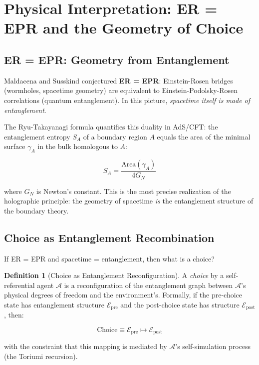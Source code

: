 \documentclass[12pt,a4paper]{article}
\theoremstyle{definition}
\newtheorem{definition}[theorem]{Definition}
\theoremstyle{remark}
\newcommand{\cA}{\mathcal{A}}
\begin{document}
\section{Physical Interpretation: ER = EPR and the Geometry of Choice}

\subsection{ER = EPR: Geometry from Entanglement}

Maldacena and Susskind \cite{maldacena2013} conjectured \textbf{ER = EPR}:
Einstein-Rosen bridges (wormholes, spacetime geometry) are equivalent to
Einstein-Podolsky-Rosen correlations (quantum entanglement). In this picture,
\textit{spacetime itself is made of entanglement}.

The Ryu-Takayanagi formula \cite{ryu2006a, ryu2006b} quantifies this duality
in AdS/CFT: the entanglement entropy $S_A$ of a boundary region $A$ equals the
area of the minimal surface $\gamma_A$ in the bulk homologous to $A$:

\begin{equation}
S_A = \frac{\text{Area}(\gamma_A)}{4G_N}
\end{equation}

where $G_N$ is Newton's constant. This is the most precise realization of the
holographic principle: the geometry of spacetime \emph{is} the entanglement
structure of the boundary theory.

\subsection{Choice as Entanglement Recombination}

If ER = EPR and spacetime = entanglement, then what is a choice?

\begin{definition}[Choice as Entanglement Reconfiguration]
A \emph{choice} by a self-referential agent $\cA$ is a reconfiguration of the
entanglement graph between $\cA$'s physical degrees of freedom and the
environment's. Formally, if the pre-choice state has entanglement structure
$\mathcal{E}_{\text{pre}}$ and the post-choice state has structure
$\mathcal{E}_{\text{post}}$, then:

\begin{equation}
\text{Choice} \equiv \mathcal{E}_{\text{pre}} \mapsto \mathcal{E}_{\text{post}}
\end{equation}

with the constraint that this mapping is mediated by $\cA$'s self-simulation
process (the Toriumi recursion).
\end{definition}
\end{document}
